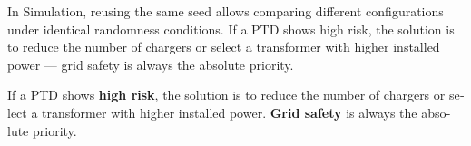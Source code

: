 \documentclass[11pt,a4paper,openany]{book}
\begin{document}
\begin{otherlanguage}{english}
In Simulation, reusing the same seed allows comparing different configurations under identical randomness conditions. If a PTD shows high risk, the solution is to reduce the number of chargers or select a transformer with higher installed power --- grid safety is always the absolute priority.

\begin{warnbox}
If a PTD shows \textbf{high risk}, the solution is to reduce the number of chargers or select a transformer with higher installed power. \textbf{Grid safety} is always the absolute priority.
\end{warnbox}

\end{otherlanguage}

\backmatter

\cleardoublepage
{}
{}
\printindex
\end{document}
